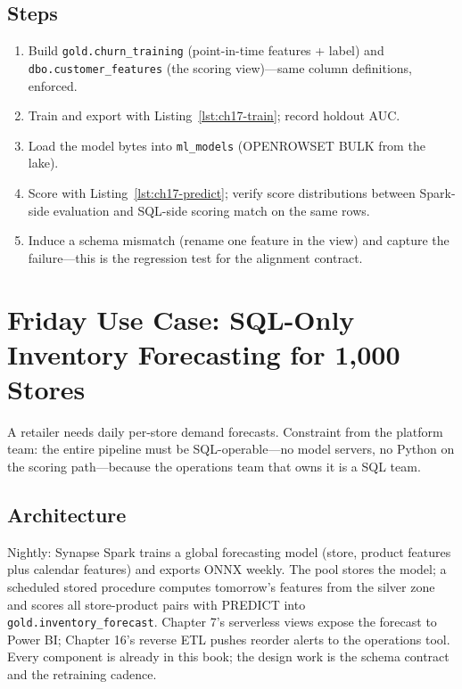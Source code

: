 \subsection{Steps}
\begin{enumerate}
    \item Build \texttt{gold.churn\_training} (point-in-time features + label) and \texttt{dbo.customer\_features} (the scoring view)---same column definitions, enforced.
    \item Train and export with Listing~\ref{lst:ch17-train}; record holdout AUC.
    \item Load the model bytes into \texttt{ml\_models} (OPENROWSET BULK from the lake).
    \item Score with Listing~\ref{lst:ch17-predict}; verify score distributions between Spark-side evaluation and SQL-side scoring match on the same rows.
    \item Induce a schema mismatch (rename one feature in the view) and capture the failure---this is the regression test for the alignment contract.
\end{enumerate}

\section{Friday Use Case: SQL-Only Inventory Forecasting for 1{,}000 Stores}
A retailer needs daily per-store demand forecasts. Constraint from the platform team: the entire pipeline must be SQL-operable---no model servers, no Python on the scoring path---because the operations team that owns it is a SQL team.

\subsection{Architecture}
Nightly: Synapse Spark trains a global forecasting model (store, product features plus calendar features) and exports ONNX weekly. The pool stores the model; a scheduled stored procedure computes tomorrow's features from the silver zone and scores all store-product pairs with PREDICT into \texttt{gold.inventory\_forecast}. Chapter 7's serverless views expose the forecast to Power BI; Chapter 16's reverse ETL pushes reorder alerts to the operations tool. Every component is already in this book; the design work is the schema contract and the retraining cadence.

